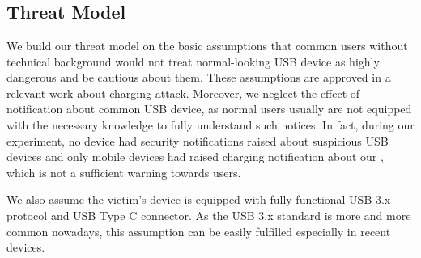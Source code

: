 \section{\tool}
\label{sec:badusb}
\subsection{Threat Model}
We build our threat model on the basic assumptions that common users without technical background would not treat normal-looking USB device as highly dangerous and be cautious about them. These assumptions are approved in a relevant work about charging attack\cite{JFCImpact}. Moreover, we neglect the effect of notification about common USB device, as normal users usually are not equipped with the necessary knowledge to fully understand such notices. In fact, during our experiment, no device had security notifications raised about suspicious USB devices and only mobile devices had raised charging notification about our \tool, which is not a sufficient warning towards users.

We also assume the victim's device is equipped with fully functional USB 3.x protocol and USB Type C connector. As the USB 3.x standard is more and more common nowadays, this assumption can be easily fulfilled especially in recent devices.


